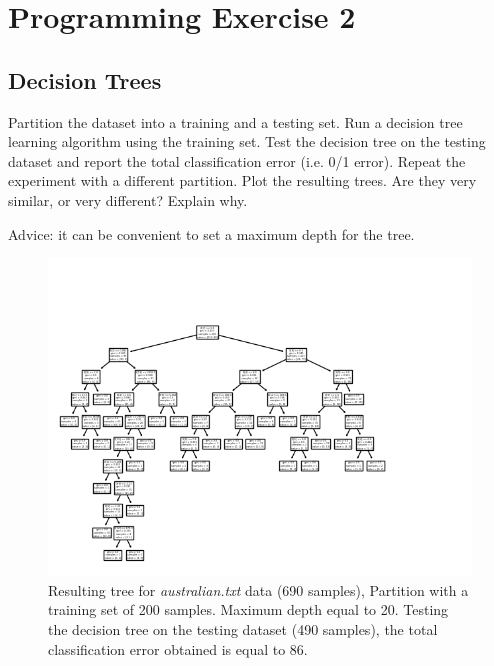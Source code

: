 \documentclass[12pt,letterpaper]{article}
\begin{document}
\section*{Programming Exercise 2}
\subsection*{Decision Trees}
Partition the dataset into a training and a testing set.
Run a decision tree learning algorithm using the training set. Test the
decision tree on the testing dataset and report the total classification error
(i.e. 0/1 error). Repeat the experiment with a different partition. Plot
the resulting trees. Are they very similar, or very different? Explain why.

Advice: it can be convenient to set a maximum depth for the tree.
\begin{figure}[H]
    \centering
    \includegraphics[width=15cm]{images/tree.jpg}
    \caption{Resulting tree for \textit{australian.txt} data (690 samples), Partition with a training set of 200 samples. Maximum depth equal to 20. Testing the decision tree on  the testing dataset (490 samples), the total classification error obtained is equal to 86.}
    \label{fig:1}
\end{figure}
\end{document}
